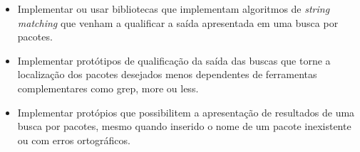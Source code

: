 
\begin{itemize}
	\item Implementar ou usar bibliotecas que implementam algoritmos de \textit{string matching} que venham a qualificar a saída apresentada em uma busca por pacotes.
	\item Implementar protótipos de qualificação da saída das buscas que torne a localização dos pacotes desejados menos dependentes de ferramentas complementares como {\code grep}, {\code more} ou {\code less}.
	\item Implementar protópios que possibilitem a apresentação de resultados de uma busca por pacotes, mesmo quando inserido o nome de um pacote inexistente ou com erros ortográficos.
\end{itemize}
